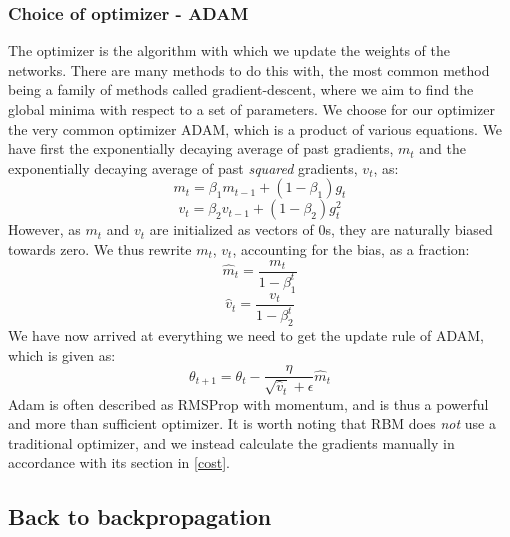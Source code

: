 \documentclass{article}
\begin{document}
\subsubsection{Choice of optimizer - ADAM} \label{opti}
The optimizer is the algorithm with which we update the weights of the networks. There are many methods to do this with, the most common method being a family of methods called gradient-descent, where we aim to find the global minima with respect to a set of parameters.
\newline
We choose for our optimizer the very common optimizer ADAM, which is a product of various equations. We have first the exponentially decaying average of past gradients, $m_t$ and the exponentially decaying average of past \emph{squared} gradients, $v_t$, as:
\begin{equation*}
    m_t = \beta_1 m_{t-1} + (1 - \beta_1)g_t
\end{equation*}
\begin{equation*}
    v_t = \beta_2 v_{t-1} + (1-\beta_2) g_t^2
\end{equation*}
However, as $m_t$ and $v_t$ are initialized as vectors of 0s, they are naturally biased towards zero. We thus rewrite $m_t$, $v_t$, accounting for the bias, as a fraction:
\begin{equation*}
    \hat m_t = \frac{m_t}{1- \beta_1^t}
\end{equation*}
\begin{equation*}
    \hat v_t = \frac{v_t}{1 - \beta_2^t}
\end{equation*}
We have now arrived at everything we need to get the update rule of ADAM, which is given as:
\begin{equation}
    \theta_{t+1} = \theta_t - \frac{\eta}{\sqrt{\hat v_t} + \epsilon} \hat m_t
\end{equation}
Adam is often described as RMSProp with momentum, and is thus a powerful and more than sufficient optimizer. \newline
It is worth noting that RBM does \emph{not} use a traditional optimizer, and we instead calculate the gradients manually in accordance with its section in \ref{cost}.
\subsection{Back to backpropagation}
\end{document}
